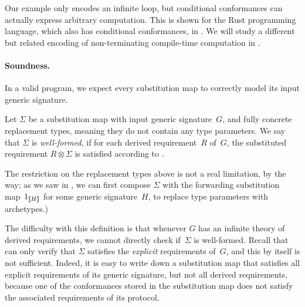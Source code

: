 \documentclass[../generics]{subfiles}
\begin{document}
Our example only encodes an infinite loop, but conditional conformances can actually express arbitrary computation. This is shown for the Rust programming language, which also has conditional conformances, in \cite{rustturing}. We will study a different but related encoding of non-terminating compile-time computation in .

\paragraph{Soundness.}
In a valid program, we expect every substitution map to correctly model its input generic signature.
\begin{definition}\label{valid subst map}
Let $\Sigma$ be a substitution map with input generic signature~$G$, and fully concrete replacement types, meaning they do not contain any type parameters. We say that $\Sigma$ is \emph{well-formed}, if for each derived requirement~$R$ of~$G$, the substituted requirement $R\otimes\Sigma$ is satisfied according to .
\end{definition}

The restriction on the replacement types above is not a real limitation, by the way; as we saw in , we can first compose $\Sigma$ with the forwarding substitution map~$1_{[\![H]\!]}$ for some generic signature~$H$, to replace type parameters with archetypes.)

The difficulty with this definition is that whenever $G$ has an infinite theory of derived requirements, we cannot directly check if~$\Sigma$ is well-formed. Recall that  can only verify that $\Sigma$ satisfies the \emph{explicit} requirements of~$G$, and this by itself is not sufficient. Indeed, it is easy to write down a substitution map that satisfies all explicit requirements of its generic signature, but not all derived requirements, because one of the conformances stored in the substitution map does not satisfy the associated requirements of its protocol.
\end{document}
